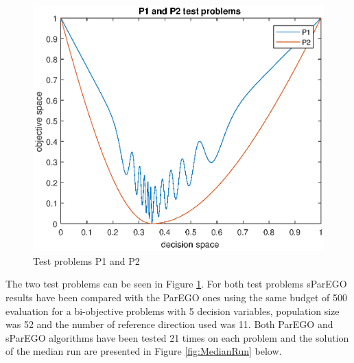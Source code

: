 \documentclass[10pt]{llncs}
\begin{document}
\begin{figure}
\vspace{-35pt}
\begin{center}
\includegraphics[scale=0.45]{testproblems}
\end{center}
\vspace{-15pt}
\caption{Test problems P1 and P2}
\vspace{-15pt}
\label{fig:TestProblems}
\end{figure}

The two test problems can be seen in Figure \ref{fig:TestProblems}. For both test problems sParEGO results have been compared with the ParEGO ones using the same budget of 500 evaluation for a bi-objective problems with 5 decision variables, population size was 52 and the number of reference direction used was 11. Both ParEGO and sParEGO algorithms have been tested 21 times on each problem and the solution of the median run are presented in Figure \ref{fig:MedianRun} below.  
    
\end{document}
